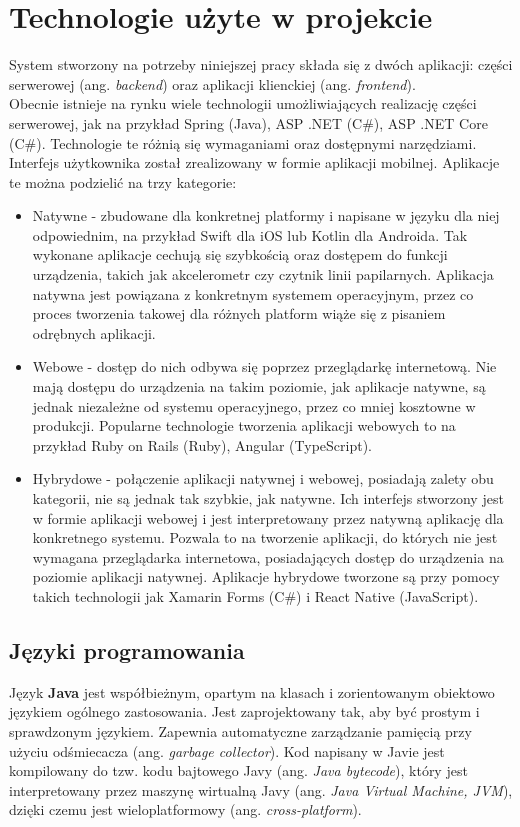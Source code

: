 \chapter{Technologie użyte w projekcie}
System stworzony na potrzeby niniejszej pracy składa się z dwóch aplikacji: części serwerowej (ang. \textit{backend}) oraz aplikacji klienckiej (ang. \textit{frontend}).\\
Obecnie istnieje na rynku wiele technologii umożliwiających realizację części serwerowej, jak na przykład Spring (Java), ASP .NET (C\#), ASP .NET Core (C\#). Technologie te różnią się wymaganiami oraz dostępnymi narzędziami.\\
Interfejs użytkownika został zrealizowany w formie aplikacji mobilnej. Aplikacje te można podzielić na trzy kategorie:
\begin{itemize}
	\item Natywne - zbudowane dla konkretnej platformy i napisane w języku dla niej odpowiednim, na przykład Swift dla iOS lub Kotlin dla Androida. Tak wykonane aplikacje cechują się szybkością oraz dostępem do funkcji urządzenia, takich jak akcelerometr czy czytnik linii papilarnych. Aplikacja natywna jest powiązana z konkretnym systemem operacyjnym, przez co proces tworzenia takowej dla różnych platform wiąże się z pisaniem odrębnych aplikacji.
	\item  Webowe - dostęp do nich odbywa się poprzez przeglądarkę internetową. Nie mają dostępu do urządzenia na takim poziomie, jak aplikacje natywne, są jednak niezależne od systemu operacyjnego, przez co mniej kosztowne w produkcji. Popularne technologie tworzenia aplikacji webowych to na przykład Ruby on Rails (Ruby), Angular (TypeScript).
	\item Hybrydowe - połączenie aplikacji natywnej i webowej, posiadają zalety obu kategorii, nie są jednak tak szybkie, jak natywne. Ich interfejs stworzony jest w formie aplikacji webowej i jest interpretowany przez natywną aplikację dla konkretnego systemu. Pozwala to na tworzenie aplikacji, do których nie jest wymagana przeglądarka internetowa, posiadających dostęp do urządzenia na poziomie aplikacji natywnej. Aplikacje hybrydowe tworzone są przy pomocy takich technologii jak Xamarin Forms (C\#) i React Native (JavaScript).
\end{itemize}
\section{Języki programowania}
Język \textbf{Java} jest współbieżnym, opartym na klasach i zorientowanym obiektowo językiem ogólnego zastosowania. Jest zaprojektowany tak, aby być prostym i sprawdzonym językiem. Zapewnia automatyczne zarządzanie pamięcią przy użyciu odśmiecacza (ang. \textit{garbage collector}). Kod napisany w Javie jest kompilowany do tzw. kodu bajtowego Javy (ang. \textit{Java bytecode}), który jest interpretowany przez maszynę wirtualną Javy (ang. \textit{Java Virtual Machine, JVM}), dzięki czemu jest wieloplatformowy (ang. \textit{cross-platform}).\cite{jamesgoslingbilljoyguysteelegiladbrachaalexbuckley2015}


